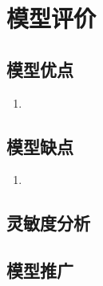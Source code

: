 \section{模型评价}
    \subsection{模型优点}
        \begin{enumerate}
            \item 
        \end{enumerate}
    \subsection{模型缺点}
        \begin{enumerate}
            \item 
        \end{enumerate}
    \subsection{灵敏度分析}
    \subsection{模型推广}